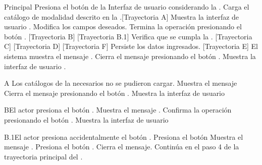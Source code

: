 \begin{UCtrayectoria}{Principal}
	\UCpaso[\UCactor] Presiona el botón de la Interfaz de usuario  considerando la  .  
	\UCpaso Carga el catálogo de modalidad descrito en la .[Trayectoria A]
	\UCpaso Muestra la interfaz de usuario .
	\UCpaso[\UCactor] Modifica los campos deseados.
	\UCpaso[\UCactor] Termina la operación presionando el botón . [Trayectoria B] [Trayectoria B.1]
	\UCpaso Verifica que se cumpla la . [Trayectoria C] [Trayectoria D] [Trayectoria F]
	\UCpaso Persiste los datos ingresados. [Trayectoria E]
	\UCpaso El sistema muestra el mensaje .
	\UCpaso[\UCactor] Cierra el mensaje presionando el botón .
	\UCpaso Muestra la interfaz de usuario .
\end{UCtrayectoria}
\begin{UCtrayectoriaA}{A}{ Los catálogos de la  necesarios no se pudieron cargar.}
	\UCpaso Muestra el mensaje 
	\UCpaso[\UCactor] Cierra el mensaje presionando el botón .
    \UCpaso Muestra la interfaz de usuario 
\end{UCtrayectoriaA}

\begin{UCtrayectoriaA}{B}{El actor presiona el botón .}
	\UCpaso Muestra el mensaje .
	\UCpaso[\UCactor] Confirma la operación presionando el botón .
	\UCpaso Muestra la interfaz de usuario 
\end{UCtrayectoriaA}

\begin{UCtrayectoriaA}{B.1}{El actor presiona accidentalmente el botón .}
	\UCpaso[\UCactor] Presiona el botón 
	\UCpaso Muestra el mensaje .
	\UCpaso[\UCactor] Presiona el botón .
	\UCpaso Cierra el mensaje.
	\UCpaso Continúa en el paso 4 de la trayectoria principal del .
\end{UCtrayectoriaA}

